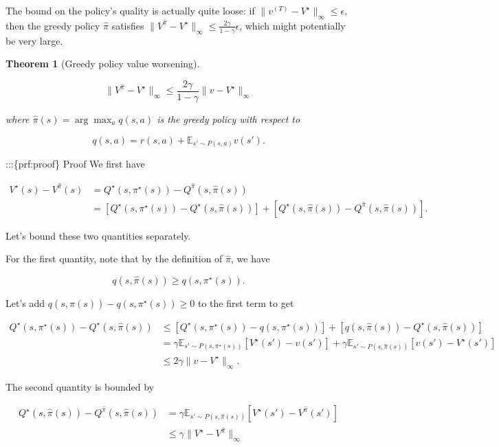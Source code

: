 \documentclass[
  letterpaper,
  DIV=11,
  numbers=noendperiod]{scrreprt}
\theoremstyle{plain}
\theoremstyle{plain}
\newtheorem{theorem}{Theorem}[chapter]
\theoremstyle{definition}
\theoremstyle{definition}
\theoremstyle{remark}
\begin{document}
The bound on the policy's quality is actually quite loose: if
\(\|v^{(T)} - V^\star\|_{\infty} \le \epsilon\), then the greedy policy
\(\hat \pi\) satisfies
\(\|V^{\hat \pi} - V^\star\|_{\infty} \le \frac{2\gamma}{1-\gamma} \epsilon\),
which might potentially be very large.

\begin{theorem}[Greedy policy value
worsening]\protect\hypertarget{thm-greedy_worsen}{}\label{thm-greedy_worsen}

\[\|V^{\hat \pi} - V^\star \|_{\infty} \le \frac{2 \gamma}{1-\gamma} \|v - V^\star\|_{\infty}\]

where \(\hat \pi(s) = \arg\max_a q(s, a)\) is the greedy policy with
respect to

\[q(s, a) = r(s, a) + \mathbb{E}_{s' \sim P(s, a)} v(s').\]

\end{theorem}

:::\{prf:proof\} Proof We first have

\[
\begin{aligned}
        V^{\star}(s) - V^{\hat \pi}(s) &= Q^{\star}(s,\pi^\star(s)) - Q^{\hat \pi}(s, \hat \pi(s))\\
        &= [Q^{\star}(s,\pi^\star(s)) - Q^{\star}(s, \hat \pi(s))] + [Q^{\star}(s, \hat \pi(s)) - Q^{\hat \pi}(s, \hat \pi(s))].
\end{aligned}
\]

Let's bound these two quantities separately.

For the first quantity, note that by the definition of \(\hat \pi\), we
have

\[q(s, \hat \pi(s)) \ge q(s,\pi^\star(s)).\]

Let's add \(q(s, \hat \pi(s)) - q(s,\pi^\star(s)) \ge 0\) to the first
term to get

\[
\begin{aligned}
        Q^{\star}(s,\pi^\star(s)) - Q^{\star}(s, \hat \pi(s)) &\le [Q^{\star}(s,\pi^\star(s))- q(s,\pi^\star(s))] + [q(s, \hat \pi(s)) - Q^{\star}(s, \hat \pi(s))] \\
        &= \gamma \mathbb{E}_{s' \sim P(s, \pi^{\star}(s))} [ V^{\star}(s') - v(s') ] + \gamma \mathbb{E}_{s' \sim P(s, \hat \pi(s))} [ v(s') - V^{\star}(s') ] \\
        &\le 2 \gamma \|v - V^{\star}\|_{\infty}.
\end{aligned}
\]

The second quantity is bounded by

\[
\begin{aligned}
        Q^{\star}(s, \hat \pi(s)) - Q^{\hat \pi}(s, \hat \pi(s))
        &=
        \gamma \mathbb{E}_{s'\sim P(s, \hat \pi(s))}\left[ V^\star(s') - V^{\hat \pi}(s') \right] \\
        & \leq 
        \gamma \|V^{\star} - V^{\hat \pi}\|_\infty
\end{aligned}
\]
\end{document}
